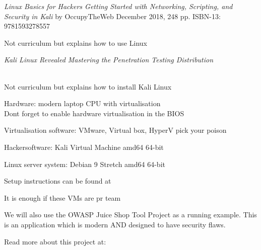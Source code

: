 \documentclass[Screen16to9,17pt]{foils}
\begin{document}


\emph{Linux Basics for Hackers
Getting Started with Networking, Scripting, and Security in Kali}
by OccupyTheWeb
December 2018, 248 pp.
ISBN-13:
9781593278557

Not curriculum but explains how to use Linux



\emph{Kali Linux Revealed  Mastering the Penetration Testing Distribution}

\\
Not curriculum but explains how to install Kali Linux







\begin{list2}
\item Hardware: modern laptop CPU with virtualisation\\
Dont forget to enable hardware virtualisation in the BIOS
\item Virtualisation software: VMware, Virtual box, HyperV pick your poison
\item Hackersoftware: Kali Virtual Machine amd64 64-bit 
\item Linux server system: Debian 9 Stretch amd64 64-bit 
\item Setup instructions can be found at 
\end{list2}

\centerline{It is enough if these VMs are pr team}


We will also use the OWASP Juice Shop Tool Project as a running example. This is an application which is modern AND designed to have security flaws.

Read more about this project at: \\ 
\end{document}
